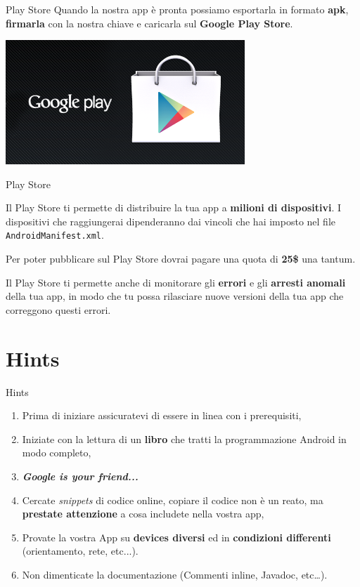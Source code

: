 \documentclass[xcolor=svgnames,11pt]{beamer}
\begin{document}
\begin{frame}{Play Store}
Quando la nostra app \`e pronta possiamo esportarla in formato \textbf{apk}, \textbf{firmarla} con la nostra chiave e caricarla sul \textbf{Google Play Store}.

\begin{center}
\includegraphics[width=9cm]{playstore.png}
\end{center}
\end{frame}

\begin{frame}{Play Store}

Il Play Store ti permette di distribuire la tua app a \textbf{milioni di dispositivi}. I dispositivi che raggiungerai dipenderanno dai vincoli che hai imposto nel file \texttt{AndroidManifest.xml}.

\medskip
\pause

\begin{block}{}
Per poter pubblicare sul Play Store dovrai pagare una quota di \textbf{25\$} una tantum.
\end{block}

\medskip
\pause

Il Play Store ti permette anche di monitorare gli \textbf{errori} e gli \textbf{arresti anomali} della tua app, in modo che tu possa rilasciare nuove versioni della tua app che correggono questi errori.
\end{frame}


\section{Hints}

\begin{frame}{Hints}
\pause
\begin{enumerate}
\item Prima di iniziare assicuratevi di essere in linea con i prerequisiti,
\pause
\item Iniziate con la lettura di un \textbf{libro} che tratti la programmazione Android in modo completo,
\pause
\item \textbf{\emph{Google is your friend...}}
\pause
\item Cercate \textit{snippets} di codice online, copiare il codice non \`e un reato, ma \textbf{prestate attenzione} a cosa includete nella vostra app,
\pause
\item Provate la vostra App su \textbf{devices diversi} ed in \textbf{condizioni differenti} (orientamento, rete, etc...).
\pause
\item Non dimenticate la documentazione (Commenti inline, Javadoc, etc\ldots).
\end{enumerate}
\end{frame}
\end{document}
